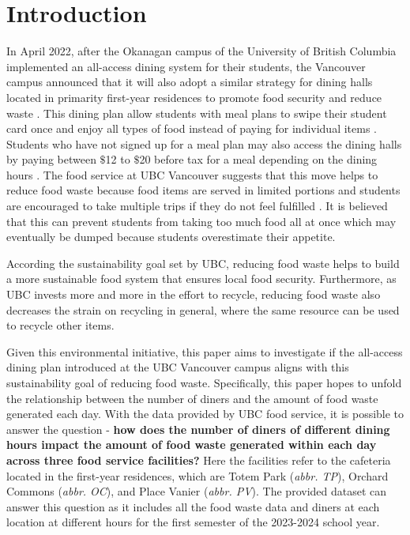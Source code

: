 \section{Introduction}
In April 2022, after the Okanagan campus of the University of British Columbia implemented an all-access dining system for their students, the Vancouver campus announced that it will also adopt a similar strategy for dining halls located in primarity first-year residences to promote food security and reduce waste \citep{introduce_all_access}. This dining plan allow students with meal plans to swipe their student card once and enjoy all types of food instead of paying for individual items \citep{ubcallaccessdining}. Students who have not signed up for a meal plan may also access the dining halls by paying between $\$$12 to $\$$20 before tax for a meal depending on the dining hours \citep{ubcallaccessdining}. The food service at UBC Vancouver suggests that this move helps to reduce food waste because food items are served in limited portions and students are encouraged to take multiple trips if they do not feel fulfilled \citep{ubcallaccessdining}. It is believed that this can prevent students from taking too much food all at once which may eventually be dumped because students overestimate their appetite.

According the sustainability goal set by UBC, reducing food waste helps to build a more sustainable food system that ensures local food security. Furthermore, as UBC invests more and more in the effort to recycle, reducing food waste also decreases the strain on recycling in general, where the same resource can be used to recycle other items.

Given this environmental initiative, this paper aims to investigate if the all-access dining plan introduced at the UBC Vancouver campus aligns with this sustainability goal of reducing food waste. Specifically, this paper hopes to unfold the relationship between the number of diners and the amount of food waste generated each day. With the data provided by UBC food service, it is possible to answer the question - \textbf{how does the number of diners of different dining hours impact the amount of food waste generated within each day across three food service facilities?} Here the facilities refer to the cafeteria located in the first-year residences, which are Totem Park (\textit{abbr. TP}), Orchard Commons (\textit{abbr. OC}), and Place Vanier (\textit{abbr. PV}). The provided dataset can answer this question as it includes all the food waste data and diners at each location at different hours for the first semester of the 2023-2024 school year.

